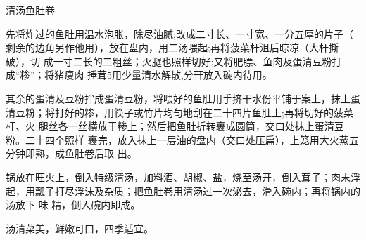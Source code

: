 \begin{recipe}{清汤鱼肚卷}

\ingredients


\cooking

\step 先将炸过的鱼肚用温水泡胀，除尽油腻;改成二寸长、一寸宽、一分五厚的片子（
剩余的边角另作他用），放在盘内，用二汤喂起;再将菠菜杆沮后晾凉（大杆撕破），切
成一寸二长的二粗丝；火腿也照样切好;又将肥膘、鱼肉及蛋清豆粉打成“糁”；将猪痩肉
捶茸5用少量清水解散,分幵放入碗内待用。

\step 其余的蛋清及豆粉拌成蛋清豆粉，将喂好的鱼肚用手挤干水份平铺于案上，抹上蛋
清豆粉；将打好的糁，用筷子或竹片均匀地刮在二十四片鱼肚上;再将切好的菠菜杆、火
腿丝各一丝横放于糁上；然后把鱼肚折转裹成圆筒，交口处抹上蛋清豆粉。二十四个照样
裹完，放入抹上一层油的盘内（交口处压扁），上笼用大火蒸五分钟即熟，成鱼肚卷后取
出。

\step 锅放在旺火上，倒入特级清汤，加料酒、胡椒、盐，烧至汤开，倒入茸子；肉末浮
起，用瓢子打尽浮沫及杂质；把鱼肚卷用清汤过一次泌去，滑入碗内；再将锅内的汤放下
味 精，倒入碗内即成。

\features

汤清菜美，鲜嫩可口，四季适宜。

\end{recipe}

